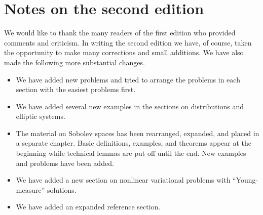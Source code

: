 \section*{Notes on the second edition}\label{sec:second-edition-notes}

We would like to thank the many readers of the first edition who provided comments and criticism. In writing the second edition we have, of course, taken the opportunity to make many corrections and small additions. We have also made the following more substantial changes.

\begin{itemize}
\item We have added new problems and tried to arrange the problems in each section with the easiest problems first.
\item We have added several new examples in the sections on distributions and elliptic systems.
\item The material on Sobolev spaces has been rearranged, expanded, and placed in a separate chapter. Basic definitions, examples, and theorems appear at the beginning while technical lemmas are put off until the end. New examples and problems have been added.
\item We have added a new section on nonlinear variational problems with ``Young-measure'' solutions.
\item We have added an expanded reference section.
\end{itemize}

